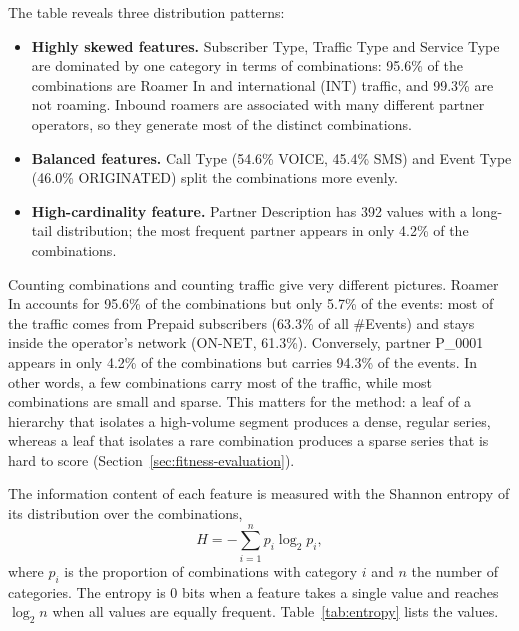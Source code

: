 The table reveals three distribution patterns:
\begin{itemize}
    \item \textbf{Highly skewed features.} Subscriber Type, Traffic Type and Service Type are dominated by one category in terms of combinations: 95.6\% of the combinations are Roamer In and international (INT) traffic, and 99.3\% are not roaming. Inbound roamers are associated with many different partner operators, so they generate most of the distinct combinations.
    \item \textbf{Balanced features.} Call Type (54.6\% VOICE, 45.4\% SMS) and Event Type (46.0\% ORIGINATED) split the combinations more evenly.
    \item \textbf{High-cardinality feature.} Partner Description has 392 values with a long-tail distribution; the most frequent partner appears in only 4.2\% of the combinations.
\end{itemize}

Counting combinations and counting traffic give very different pictures.
Roamer In accounts for 95.6\% of the combinations but only 5.7\% of the events: most of the traffic comes from Prepaid subscribers (63.3\% of all \#Events) and stays inside the operator's network (ON-NET, 61.3\%).
Conversely, partner P\_0001 appears in only 4.2\% of the combinations but carries 94.3\% of the events.
In other words, a few combinations carry most of the traffic, while most combinations are small and sparse.
This matters for the method: a leaf of a hierarchy that isolates a high-volume segment produces a dense, regular series, whereas a leaf that isolates a rare combination produces a sparse series that is hard to score (Section~\ref{sec:fitness-evaluation}).

The information content of each feature is measured with the Shannon entropy of its distribution over the combinations,
\begin{equation}
    H = -\sum_{i=1}^{n} p_i \log_2 p_i,
\end{equation}
where $p_i$ is the proportion of combinations with category $i$ and $n$ the number of categories.
The entropy is 0 bits when a feature takes a single value and reaches $\log_2 n$ when all values are equally frequent.
Table~\ref{tab:entropy} lists the values.

